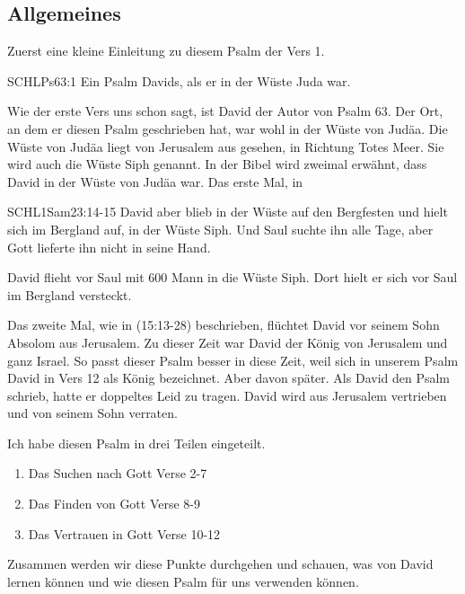 \documentclass[fontsize=16pt]{mybib}
\begin{document}
    \subsection*{Allgemeines}
    \begin{otsblock}[Allgemeines]
    Zuerst eine kleine Einleitung zu diesem Psalm der Vers 1.
        \begin{bibelbox}{SCHL}{Ps}{63:1}
            Ein Psalm Davids, als er in der Wüste Juda war.
        \end{bibelbox}
    Wie der erste Vers uns schon sagt, ist David der Autor von Psalm 63. Der Ort, an dem er diesen Psalm geschrieben hat, war wohl in der Wüste von Judäa. Die Wüste von Judäa liegt von Jerusalem aus gesehen, in Richtung Totes Meer. Sie wird auch die Wüste Siph genannt. In der Bibel wird zweimal erwähnt, dass David in der Wüste von Judäa war. Das erste Mal, in     
    \begin{bibelbox}{SCHL}{1Sam}{23:14-15}
        David aber blieb in der Wüste auf den Bergfesten und hielt sich im Bergland auf, in der Wüste Siph. Und Saul suchte ihn alle Tage, aber Gott lieferte ihn nicht in seine Hand.
    \end{bibelbox}    
    David flieht vor Saul mit 600 Mann in die Wüste Siph. Dort hielt er sich vor Saul im Bergland versteckt.
    
    Das zweite Mal, wie in (15:13-28) beschrieben, flüchtet David vor seinem Sohn Absolom aus Jerusalem. Zu dieser Zeit war David der König von Jerusalem und ganz Israel. So passt dieser Psalm besser in diese Zeit, weil sich in unserem Psalm David in Vers 12 als König bezeichnet. Aber davon später. Als David den Psalm schrieb, hatte er doppeltes Leid zu tragen. David wird aus Jerusalem vertrieben und von seinem Sohn verraten.
    \end{otsblock}
    \begin{otsblock}
        Ich habe diesen Psalm in drei Teilen eingeteilt. 
        \begin{enumerate}
            \item Das Suchen nach Gott Verse 2-7
            \item Das Finden von Gott Verse 8-9
            \item Das Vertrauen in Gott Verse 10-12
        \end{enumerate}
        Zusammen werden wir diese Punkte durchgehen und schauen, was  von David lernen können und wie  diesen Psalm für uns verwenden können.
    \end{otsblock}
\end{document}
